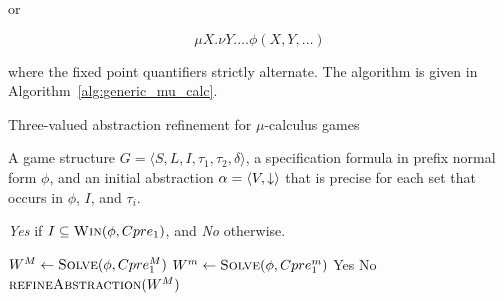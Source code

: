 or

\begin{equation}
\mu X. \nu Y. \ldots \phi(X, Y, \ldots)
\end{equation}

\noindent where the fixed point quantifiers strictly alternate. The algorithm is given in Algorithm~\ref{alg:generic_mu_calc}.

\begin{algorithm}
\caption{Three-valued abstraction refinement for $\mu$-calculus games}
\label{alg:generic_mu_calc}

\begin{algorithmic}[1]

 A game structure $G = \langle S, L, I, \tau_1, \tau_2, \delta \rangle$, a specification formula in prefix normal form $\phi$, and an initial abstraction $\alpha=\langle V, \mathord{\downarrow} \rangle$ that is precise for each set that occurs in $\phi$, $I$, and $\tau_i$.

 {\it Yes} if $I \subseteq \textsc{Win}(\phi, Cpre_1)$, and {\it No} otherwise.

    \Loop
    \State $W^M \gets \textsc{Solve}(\phi, Cpre_1^M)$ \label{a:tvmc:sM}
    \State $W^m \gets \textsc{Solve}(\phi, Cpre_1^m)$ \label{a:tvmc:sm}
            \State\Return Yes \label{a:tvmc:Y}
            \State\Return No \label{a:tvmc:N}
        \Else       
            \State$\Call{refineAbstraction}{W^M}$
        \EndIf
    \EndLoop
\EndFunction

\end{algorithmic}
\end{algorithm}

